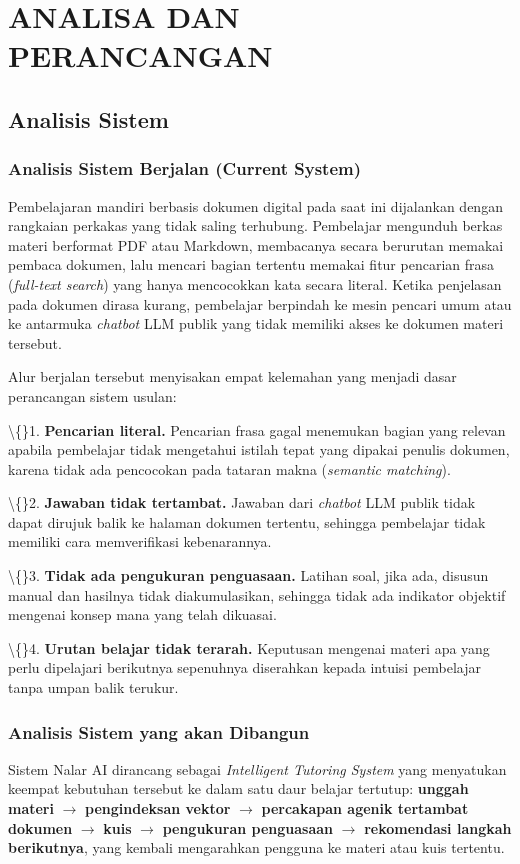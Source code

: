 \documentclass[12pt,a4paper]{article}
\begin{document}
\section*{ANALISA DAN PERANCANGAN}
\subsection*{Analisis Sistem}
\subsubsection*{Analisis Sistem Berjalan (Current System)}
Pembelajaran mandiri berbasis dokumen digital pada saat ini dijalankan dengan rangkaian perkakas yang tidak saling terhubung. Pembelajar mengunduh berkas materi berformat PDF atau Markdown, membacanya secara berurutan memakai pembaca dokumen, lalu mencari bagian tertentu memakai fitur pencarian frasa (\textit{full-text search}) yang hanya mencocokkan kata secara literal. Ketika penjelasan pada dokumen dirasa kurang, pembelajar berpindah ke mesin pencari umum atau ke antarmuka \textit{chatbot} LLM publik yang tidak memiliki akses ke dokumen materi tersebut.

Alur berjalan tersebut menyisakan empat kelemahan yang menjadi dasar perancangan sistem usulan:

\textbackslash\{\}1. \textbf{Pencarian literal.} Pencarian frasa gagal menemukan bagian yang relevan apabila pembelajar tidak mengetahui istilah tepat yang dipakai penulis dokumen, karena tidak ada pencocokan pada tataran makna (\textit{semantic matching}).

\textbackslash\{\}2. \textbf{Jawaban tidak tertambat.} Jawaban dari \textit{chatbot} LLM publik tidak dapat dirujuk balik ke halaman dokumen tertentu, sehingga pembelajar tidak memiliki cara memverifikasi kebenarannya.

\textbackslash\{\}3. \textbf{Tidak ada pengukuran penguasaan.} Latihan soal, jika ada, disusun manual dan hasilnya tidak diakumulasikan, sehingga tidak ada indikator objektif mengenai konsep mana yang telah dikuasai.

\textbackslash\{\}4. \textbf{Urutan belajar tidak terarah.} Keputusan mengenai materi apa yang perlu dipelajari berikutnya sepenuhnya diserahkan kepada intuisi pembelajar tanpa umpan balik terukur.

\subsubsection*{Analisis Sistem yang akan Dibangun}
Sistem Nalar AI dirancang sebagai \textit{Intelligent Tutoring System} yang menyatukan keempat kebutuhan tersebut ke dalam satu daur belajar tertutup: \textbf{unggah materi} \textit{$\rightarrow$} \textbf{pengindeksan vektor} \textit{$\rightarrow$} \textbf{percakapan agenik tertambat dokumen} \textit{$\rightarrow$} \textbf{kuis} \textit{$\rightarrow$} \textbf{pengukuran penguasaan} \textit{$\rightarrow$} \textbf{rekomendasi langkah berikutnya}, yang kembali mengarahkan pengguna ke materi atau kuis tertentu.
\end{document}
